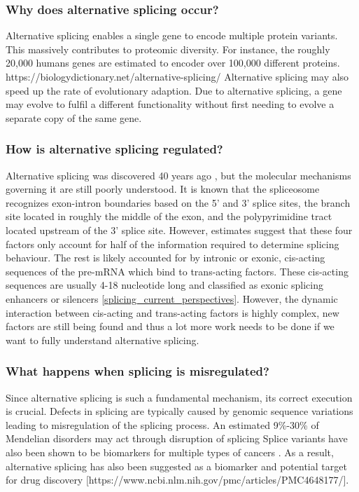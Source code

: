 \subsubsection{Why does alternative splicing occur?}
Alternative splicing enables a single gene to encode multiple protein variants. This massively contributes to proteomic diversity. For instance, the roughly 20,000 humans genes are estimated to encoder over 100,000 different proteins.\\ https://biologydictionary.net/alternative-splicing/
Alternative splicing may also speed up the rate of evolutionary adaption. Due to alternative splicing, a gene may evolve to fulfil a different functionality without first needing to evolve a separate copy of the same gene. \cite{bretschneiderphdthesis}
\subsubsection{How is alternative splicing regulated?}
Alternative splicing was discovered 40 years ago \cite{discoveryofsplicing}, but the molecular mechanisms governing it are still poorly understood. It is known that the spliceosome recognizes exon-intron boundaries based on the 5' and 3' splice sites, the branch site located in roughly the middle of the exon, and the polypyrimidine tract located upstream of the 3' splice site. However, estimates suggest that these four factors only account for half of the information required to determine splicing behaviour. The rest is likely accounted for by intronic or exonic, cis-acting sequences of the pre-mRNA which bind to trans-acting factors. These cis-acting sequences are usually 4-18 nucleotide long and classified as exonic splicing enhancers or silencers \ref{splicing_current_perspectives}.
However, the dynamic interaction between cis-acting and trans-acting factors is highly complex, new factors are still being found and thus a lot more work needs to be done if we want to fully understand alternative splicing.

\subsubsection{What happens when splicing is misregulated?}
Since alternative splicing is such a fundamental mechanism, its correct execution is crucial. Defects in splicing are typically caused by genomic sequence variations leading to misregulation of the splicing process. An estimated 9\%-30\% of Mendelian disorders may act through disruption of splicing \cite{comparison}
Splice variants have also been shown to be biomarkers for multiple types of cancers \cite{cancer}. As a result, alternative splicing has also been suggested as a biomarker and potential target for drug discovery [https://www.ncbi.nlm.nih.gov/pmc/articles/PMC4648177/]. \\

